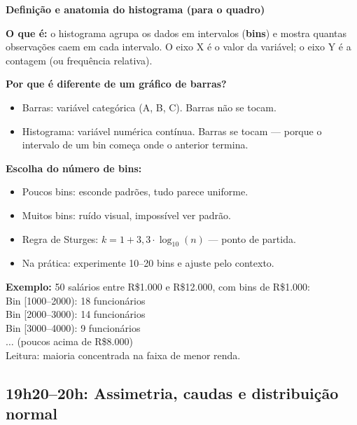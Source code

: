 \begin{BoardBox}
\textbf{Definição e anatomia do histograma (para o quadro)}

\textbf{O que é:} o histograma agrupa os dados em intervalos (\textbf{bins})
e mostra quantas observações caem em cada intervalo. O eixo X é o
valor da variável; o eixo Y é a contagem (ou frequência relativa).

\textbf{Por que é diferente de um gráfico de barras?}
\begin{itemize}
  \item Barras: variável categórica (A, B, C). Barras não se tocam.
  \item Histograma: variável numérica contínua. Barras se tocam — porque
  o intervalo de um bin começa onde o anterior termina.
\end{itemize}

\textbf{Escolha do número de bins:}
\begin{itemize}
  \item Poucos bins: esconde padrões, tudo parece uniforme.
  \item Muitos bins: ruído visual, impossível ver padrão.
  \item Regra de Sturges: $k = 1 + 3{,}3 \cdot \log_{10}(n)$ — ponto de partida.
  \item Na prática: experimente 10–20 bins e ajuste pelo contexto.
\end{itemize}

\textbf{Exemplo:} 50 salários entre R\$1.000 e R\$12.000, com bins de R\$1.000:\\
Bin [1000–2000): 18 funcionários\\
Bin [2000–3000): 14 funcionários\\
Bin [3000–4000): 9 funcionários\\
$\ldots$ (poucos acima de R\$8.000)\\
Leitura: maioria concentrada na faixa de menor renda.
\end{BoardBox}

\subsection{19h20–20h: Assimetria, caudas e distribuição normal}

